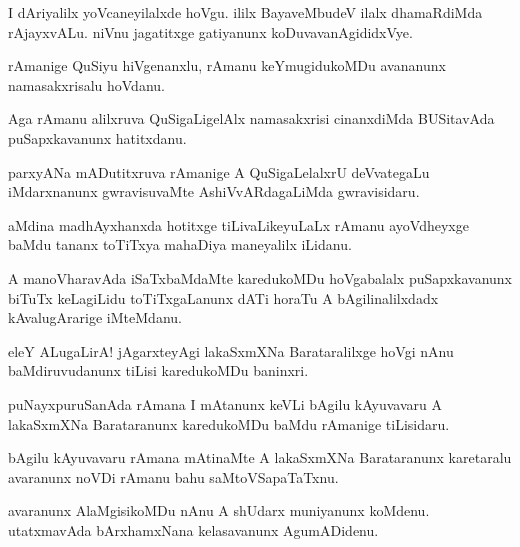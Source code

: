 \begin{mng}
I dAriyalilx yoVcaneyilalxde hoVgu. ililx BayaveMbudeV ilalx dhamaRdiMda rAjayxvALu. niVnu jagatitxge gatiyanunx koDuvavanAgididxVye.
\end{mng}

\begin{mng}
rAmanige QuSiyu hiVgenanxlu, rAmanu keYmugidukoMDu avananunx namasakxrisalu hoVdanu.
\end{mng}

\begin{mng}
Aga rAmanu alilxruva QuSigaLigelAlx namasakxrisi cinanxdiMda BUSitavAda puSapxkavanunx hatitxdanu.
\end{mng}

\begin{mng}
parxyANa mADutitxruva rAmanige A QuSigaLelalxrU deVvategaLu iMdarxnanunx gwravisuvaMte AshiVvARdagaLiMda gwravisidaru.
\end{mng}

\begin{mng}
aMdina madhAyxhanxda hotitxge tiLivaLikeyuLaLx rAmanu ayoVdheyxge baMdu tananx toTiTxya mahaDiya maneyalilx iLidanu.
\end{mng}

\begin{mng}
A manoVharavAda iSaTxbaMdaMte karedukoMDu hoVgabalalx puSapxkavanunx biTuTx keLagiLidu toTiTxgaLanunx dATi horaTu A bAgilinalilxdadx kAvalugArarige iMteMdanu.
\end{mng}

\begin{mng}
eleY ALugaLirA! jAgarxteyAgi lakaSxmXNa Barataralilxge hoVgi nAnu baMdiruvudanunx tiLisi karedukoMDu baninxri.
\end{mng}

\begin{mng}
puNayxpuruSanAda rAmana I mAtanunx keVLi bAgilu kAyuvavaru A lakaSxmXNa Barataranunx karedukoMDu baMdu rAmanige tiLisidaru.
\end{mng}

\begin{mng}
bAgilu kAyuvavaru rAmana mAtinaMte A lakaSxmXNa Barataranunx karetaralu avaranunx noVDi rAmanu bahu saMtoVSapaTaTxnu.
\end{mng}

\begin{mng}
avaranunx AlaMgisikoMDu nAnu A shUdarx muniyanunx koMdenu. utatxmavAda bArxhamxNana kelasavanunx AgumADidenu.
\end{mng}

